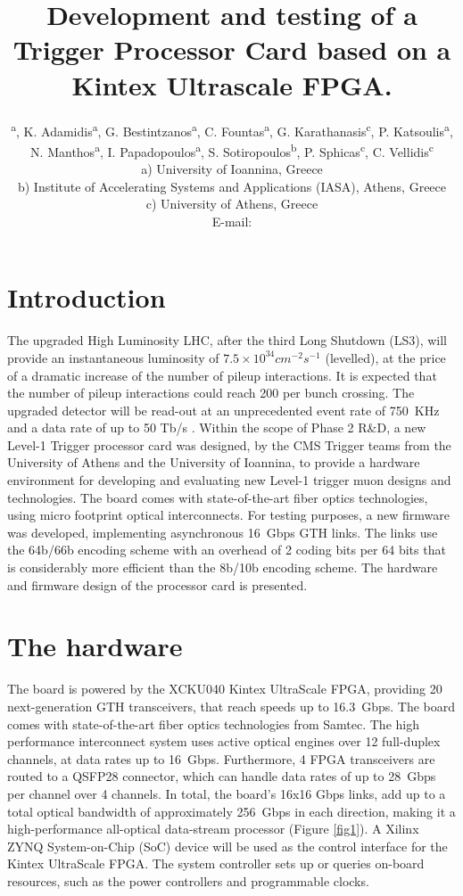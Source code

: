\documentclass[a4paper]{PoS}
\title{Development and testing of a Trigger Processor Card based on a Kintex Ultrascale FPGA.}
\author{\speaker{S. Mallios}\textsuperscript{ a}, K. Adamidis\textsuperscript{a}, G. Bestintzanos\textsuperscript{a}, C. Fountas\textsuperscript{a}, G. Karathanasis\textsuperscript{c}, P. Katsoulis\textsuperscript{a}, N. Manthos\textsuperscript{a}, I. Papadopoulos\textsuperscript{a}, S. Sotiropoulos\textsuperscript{b}, P. Sphicas\textsuperscript{c}, C. Vellidis\textsuperscript{c}\\
\llap a) University of Ioannina, Greece\\
\llap b) Institute of Accelerating Systems and Applications (IASA), Athens, Greece\\
\llap c) University of Athens, Greece\\
E-mail: \email{stavros.mallios@cern.ch}}
\begin{document}


\section{Introduction}
The upgraded High Luminosity LHC, after the third Long Shutdown (LS3), will provide an instantaneous luminosity of $7.5 \times 10^{34} cm^{-2} s^{-1}$ (levelled), at the price of a dramatic increase of the number of pileup interactions. It is expected that the number of pileup interactions could reach 200 per bunch crossing. The upgraded detector will be read-out at an unprecedented event rate of 750~KHz and a data rate of up to 50 Tb/s \cite{Collaboration:2283192}. Within the scope of Phase 2 R\&D, a new Level-1 Trigger processor card was designed, by the CMS Trigger teams from the University of Athens and the University of Ioannina, to provide a hardware environment for developing and evaluating new Level-1 trigger muon designs and technologies. The board comes with state-of-the-art fiber optics technologies, using micro footprint optical interconnects. For testing purposes, a new firmware was developed, implementing asynchronous 16~Gbps GTH links. The links use the 64b/66b encoding scheme with an overhead of 2 coding bits per 64 bits that is considerably more efficient than the 8b/10b encoding scheme. The hardware and firmware design of the processor card is presented.

\section{The hardware}
The board is powered by the XCKU040 Kintex UltraScale FPGA, providing 20 next-generation GTH transceivers, that reach speeds up to 16.3~Gbps. The board comes with state-of-the-art fiber optics technologies from Samtec. The high performance interconnect system uses active optical engines over 12 full-duplex channels, at data rates up to 16~Gbps. Furthermore, 4 FPGA transceivers are routed to a QSFP28 connector, which can handle data rates of up to 28~Gbps per channel over 4 channels. In total, the board's 16x16 Gbps links, add up to a total optical bandwidth of approximately 256~Gbps in each direction, making it a high-performance all-optical data-stream processor (Figure \ref{fig1}). A Xilinx ZYNQ System-on-Chip (SoC) device will be used as the control interface for the Kintex UltraScale FPGA. The system controller sets up or queries on-board resources, such as the power controllers and programmable clocks.
\end{document}
